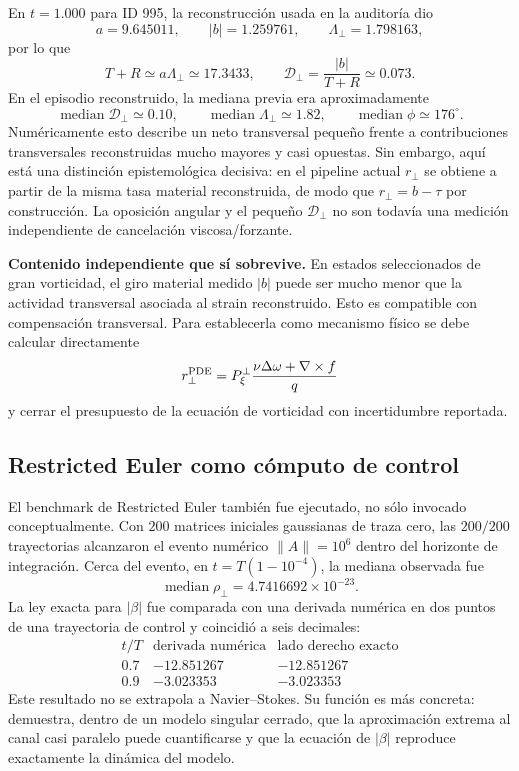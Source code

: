 \documentclass[11pt]{article}
\newcommand{\Pperp}{P_{\xi}^{\perp}}
\newcommand{\rhoT}{\rho_{\perp}}
\newcommand{\Dcal}{\mathcal D_{\perp}}
\newcommand{\Lcal}{\Lambda_{\perp}}
\newenvironment{statusbox}{\begin{mdframed}[backgroundcolor=boxbg,linecolor=rule,linewidth=0.6pt,roundcorner=2pt,innerleftmargin=10pt,innerrightmargin=10pt,innertopmargin=8pt,innerbottommargin=8pt]}{\end{mdframed}}
\begin{document}
En $t=1.000$ para ID 995, la reconstrucción usada en la auditoría dio
\[
a=9.645011,\qquad |b|=1.259761,\qquad \Lcal=1.798163,
\]
por lo que
\[
T+R\simeq a\Lcal\simeq17.3433,
\qquad
\Dcal=\frac{|b|}{T+R}\simeq0.073.
\]
En el episodio reconstruido, la mediana previa era aproximadamente
\[
\operatorname{median}\Dcal\simeq0.10,\qquad
\operatorname{median}\Lcal\simeq1.82,\qquad
\operatorname{median}\phi\simeq176^\circ.
\]
Numéricamente esto describe un neto transversal pequeño frente a contribuciones transversales reconstruidas mucho mayores y casi opuestas. Sin embargo, aquí está una distinción epistemológica decisiva: en el pipeline actual $r_\perp$ se obtiene a partir de la misma tasa material reconstruida, de modo que $r_\perp=b-\tau$ por construcción. La oposición angular y el pequeño $\Dcal$ no son todavía una medición independiente de cancelación viscosa/forzante.

\begin{statusbox}
\textbf{Contenido independiente que sí sobrevive.} En estados seleccionados de gran vorticidad, el giro material medido $|b|$ puede ser mucho menor que la actividad transversal asociada al strain reconstruido. Esto es compatible con compensación transversal. Para establecerla como mecanismo físico se debe calcular directamente
\[
r_\perp^{\rm PDE}=\Pperp\frac{\nu\Delta\omega+\nabla\times f}{q}
\]
y cerrar el presupuesto de la ecuación de vorticidad con incertidumbre reportada.
\end{statusbox}

\subsection{Restricted Euler como cómputo de control}

El benchmark de Restricted Euler también fue ejecutado, no sólo invocado conceptualmente. Con $200$ matrices iniciales gaussianas de traza cero, las $200/200$ trayectorias alcanzaron el evento numérico $\|A\|=10^6$ dentro del horizonte de integración. Cerca del evento, en $t=T(1-10^{-4})$, la mediana observada fue
\[
\boxed{\operatorname{median}\rhoT=4.7416692\times10^{-23}}.
\]
La ley exacta para $|\beta|$ fue comparada con una derivada numérica en dos puntos de una trayectoria de control y coincidió a seis decimales:
\[
\begin{array}{c|cc}
 t/T & \text{derivada numérica} & \text{lado derecho exacto}\\
\hline
0.7 & -12.851267 & -12.851267\\
0.9 & -3.023353 & -3.023353
\end{array}
\]
Este resultado no se extrapola a Navier--Stokes. Su función es más concreta: demuestra, dentro de un modelo singular cerrado, que la aproximación extrema al canal casi paralelo puede cuantificarse y que la ecuación de $|\beta|$ reproduce exactamente la dinámica del modelo.
\end{document}
